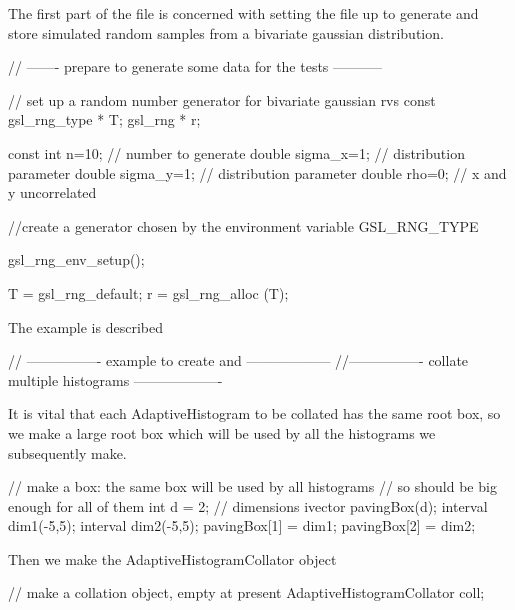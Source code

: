 \-The first part of the file is concerned with setting the file up to generate and store simulated random samples from a bivariate gaussian distribution.


\begin{DoxyCodeInclude}
    // ------- prepare to generate some data for the tests -----------

    // set up a random number generator for bivariate gaussian rvs
    const gsl_rng_type * T;
    gsl_rng * r;

    const int n=10;  // number to generate
    double sigma_x=1;   // distribution parameter
    double sigma_y=1;   // distribution parameter
    double rho=0;       // x and y uncorrelated

    //create a generator chosen by the environment variable GSL_RNG_TYPE

    gsl_rng_env_setup();

    T = gsl_rng_default;
    r = gsl_rng_alloc (T);

\end{DoxyCodeInclude}


\-The example is described


\begin{DoxyCodeInclude}
    // ----------------   example to create and ------------------
    //---------------- collate multiple histograms -------------------

\end{DoxyCodeInclude}


\-It is vital that each \-Adaptive\-Histogram to be collated has the same root box, so we make a large root box which will be used by all the histograms we subsequently make.


\begin{DoxyCodeInclude}
    // make a box: the same box will be used by all histograms
    // so should be big enough for all of them
    int d = 2; // dimensions
    ivector pavingBox(d);
    interval dim1(-5,5);
    interval dim2(-5,5);
    pavingBox[1] = dim1;
    pavingBox[2] = dim2;

\end{DoxyCodeInclude}


\-Then we make the \-Adaptive\-Histogram\-Collator object


\begin{DoxyCodeInclude}
    // make a collation object, empty at present
    AdaptiveHistogramCollator coll;

\end{DoxyCodeInclude}


